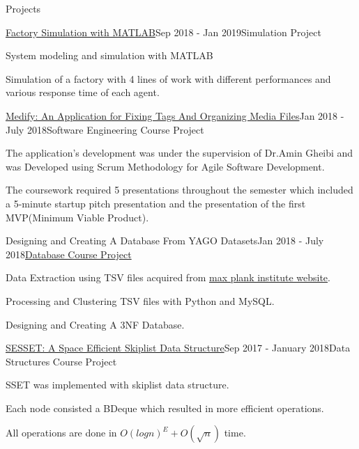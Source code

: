 \documentclass{resume} %
\begin{document}
	\begin{rSection}{Projects}
		
		\begin{rSubsection}{\href{https://github.com/pouyaaghahoseini/System-Queueing-Simulation}{Factory Simulation with MATLAB}}{Sep 2018 - Jan 2019}{Simulation  Project}{ }
			\item System modeling and simulation with MATLAB
			\item Simulation of a factory with 4 lines of work with different performances and various response time of each agent.
			
			
		\end{rSubsection}
	
		\begin{rSubsection}{\href{https://github.com/pouyaaghahoseini/Medify}{Medify: An Application for Fixing Tags And Organizing Media Files}}{Jan 2018 - July 2018}{Software Engineering Course Project}{ }
			
			\item The application's development was under the supervision of Dr.Amin Gheibi and was Developed using Scrum Methodology for Agile Software Development.
			\item The coursework required 5 presentations throughout the semester which included a 5-minute startup pitch presentation and the presentation of the first MVP(Minimum Viable Product).
		\end{rSubsection}
		
		\begin{rSubsection}{Designing and Creating A Database From YAGO Datasets}{Jan 2018 - July 2018}{\href{https://github.com/pouyaaghahoseini/Database-Course}{Database Course Project}}{ }
			\item Data Extraction using TSV files acquired from \href{https://www.mpi-inf.mpg.de/departments/databases-and-information-systems/research/yago-naga/yago/downloads/}{max plank institute website}.
			\item Processing and Clustering TSV files with Python and MySQL.
			\item Designing and Creating A 3NF Database.
			
		\end{rSubsection}	
		
		
		\begin{rSubsection}{\href{https://github.com/pouyaaghahoseini/DS-Course/tree/master/SE-Skiplist}{SESSET: A Space Efficient Skiplist Data Structure}}{Sep 2017 - January 2018}{Data Structures Course Project}{ }
			\item SSET‌ was implemented with skiplist data structure.
			\item Each node consisted a BDeque which resulted in more efficient operations.
			\item All operations are done in $O(logn)^{E} + O(\sqrt{n})$ time.
		\end{rSubsection}
		

\end{rSection}
\end{document}
